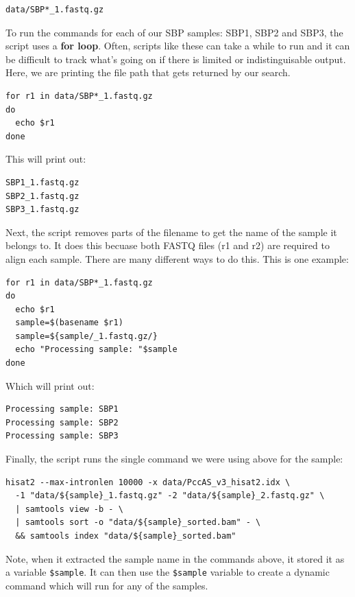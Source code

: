 \documentclass[11pt]{article}
\begin{document}
\begin{verbatim}
data/SBP*_1.fastq.gz
\end{verbatim}

\newpage

To run the commands for each of our SBP samples: SBP1, SBP2 and SBP3,
the script uses a \textbf{for loop}. Often, scripts like these can take
a while to run and it can be difficult to track what's going on if there
is limited or indistinguisable output. Here, we are printing the file
path that gets returned by our search.

\begin{verbatim}
for r1 in data/SBP*_1.fastq.gz
do
  echo $r1
done
\end{verbatim}

This will print out:

\begin{verbatim}
SBP1_1.fastq.gz
SBP2_1.fastq.gz
SBP3_1.fastq.gz
\end{verbatim}

Next, the script removes parts of the filename to get the name of the
sample it belongs to. It does this becuase both FASTQ files (r1 and r2)
are required to align each sample. There are many different ways to do
this. This is one example:

\begin{verbatim}
for r1 in data/SBP*_1.fastq.gz
do
  echo $r1
  sample=$(basename $r1)
  sample=${sample/_1.fastq.gz/}
  echo "Processing sample: "$sample
done
\end{verbatim}

Which will print out:

\begin{verbatim}
Processing sample: SBP1
Processing sample: SBP2
Processing sample: SBP3
\end{verbatim}

Finally, the script runs the single command we were using above for the
sample:

\begin{verbatim}
hisat2 --max-intronlen 10000 -x data/PccAS_v3_hisat2.idx \
  -1 "data/${sample}_1.fastq.gz" -2 "data/${sample}_2.fastq.gz" \
  | samtools view -b - \
  | samtools sort -o "data/${sample}_sorted.bam" - \
  && samtools index "data/${sample}_sorted.bam"
\end{verbatim}

Note, when it extracted the sample name in the commands above, it stored
it as a variable \texttt{\$sample}. It can then use the
\texttt{\$sample} variable to create a dynamic command which will run
for any of the samples.


\end{document}
